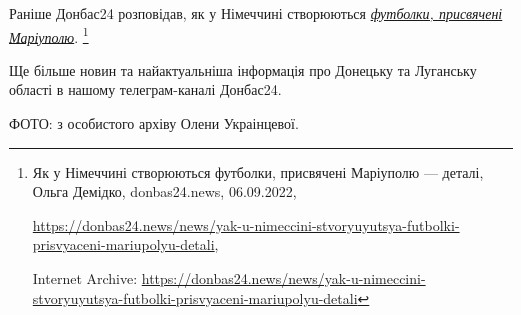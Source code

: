 
Раніше Донбас24 розповідав, як у Німеччині створюються \href{https://archive.org/details/06_09_2022.olga_demidko.donbas24.futbolki_nimecchyna_mrpl}{\emph{футболки, присвячені Маріуполю}}.%
\footnote{Як у Німеччині створюються футболки, присвячені Маріуполю — деталі, Ольга Демідко, donbas24.news, 06.09.2022, %
\par\url{https://donbas24.news/news/yak-u-nimeccini-stvoryuyutsya-futbolki-prisvyaceni-mariupolyu-detali}, \par%
Internet Archive: \url{https://donbas24.news/news/yak-u-nimeccini-stvoryuyutsya-futbolki-prisvyaceni-mariupolyu-detali}%
}

Ще більше новин та найактуальніша інформація про Донецьку та Луганську області
в нашому телеграм-каналі Донбас24.

ФОТО: з особистого архіву Олени Украінцевої.

